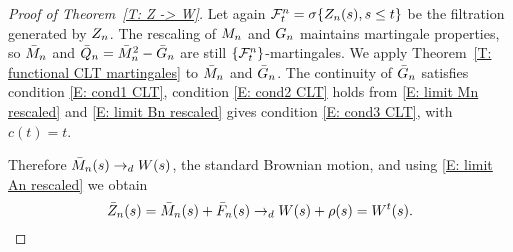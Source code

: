 \begin{proof}[Proof of Theorem~\ref{T: Z -> W}]
	Let again $\mathcal{F}^n_{t} = \sigma \{ Z_n(s), s \leq t \}$ be the filtration generated by $Z_n$.
	The rescaling of $M_n$ and $G_n$ maintains martingale properties,
	so $\bar{M}_n$ and $\bar{Q}_n = \bar{M}_n^2 - \bar{G}_n$ are still $\{\mathcal{F}^n_{t}\}$-martingales.
	We apply Theorem~\ref{T: functional CLT martingales} to $\bar{M}_n$ and $\bar{G}_n$.
	The continuity of $\bar{G}_n$ satisfies condition \eqref{E: cond1 CLT}, 
	condition \eqref{E: cond2 CLT} holds from \eqref{E: limit Mn rescaled}
	and \eqref{E: limit Bn rescaled} gives condition \eqref{E: cond3 CLT}, with $c(t) = t$.
	
	Therefore $\bar{M}_n(s) \rightarrow_d W(s)$, the standard Brownian motion, and using \eqref{E: limit An rescaled} we obtain
	\begin{equation}
	\bar{Z}_n(s) = \bar{M}_n(s) + \bar{F}_n(s) \rightarrow_d W(s) + \rho (s) = W^t(s).
	\end{equation}
\end{proof}


